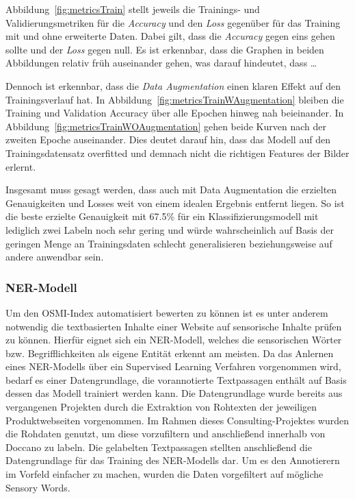 Abbildung~\ref{fig:metricsTrain} stellt jeweils die Trainings- und Validierungsmetriken für die \textit{Accuracy} und den \textit{Loss} gegenüber für das Training mit und ohne erweiterte Daten.
Dabei gilt, dass die \textit{Accuracy} gegen eins gehen sollte und der \textit{Loss} gegen null.
Es ist erkennbar, dass die Graphen in beiden Abbildungen relativ früh auseinander gehen, was darauf hindeutet, dass \ldots

Dennoch ist erkennbar, dass die \textit{Data Augmentation} einen klaren Effekt auf den Trainingsverlauf hat. In Abbildung~\ref{fig:metricsTrainWAugmentation} bleiben die Training und Validation Accuracy über alle Epochen hinweg nah beieinander.
In Abbildung~\ref{fig:metricsTrainWOAugmentation} gehen beide Kurven nach der zweiten Epoche auseinander. Dies deutet darauf hin, dass das Modell auf den Trainingsdatensatz overfitted und demnach nicht die richtigen Features der Bilder erlernt.

Insgesamt muss gesagt werden, dass auch mit Data Augmentation die erzielten Genauigkeiten und Losses weit von einem idealen Ergebnis entfernt liegen.
So ist die beste erzielte Genauigkeit mit 67.5\% für ein Klassifizierungsmodell mit lediglich zwei Labeln noch sehr gering und würde wahrscheinlich auf Basis der geringen Menge an Trainingsdaten schlecht generalisieren beziehungsweise auf andere anwendbar sein.

\subsubsection{NER-Modell}
Um den \ac{OSMI}-Index automatisiert bewerten zu können ist es unter anderem notwendig die textbasierten Inhalte einer
Website auf sensorische Inhalte prüfen zu können.
Hierfür eignet sich ein \ac{NER}-Modell, welches die sensorischen Wörter bzw. Begrifflichkeiten als eigene Entität erkennt
am meisten.
Da das Anlernen eines NER-Modells über ein Supervised Learning Verfahren vorgenommen wird, bedarf es einer Datengrundlage,
die vorannotierte Textpassagen enthält auf Basis dessen das Modell trainiert werden kann.
Die Datengrundlage wurde bereits aus vergangenen Projekten durch die Extraktion von Rohtexten der jeweiligen Produktwebseiten
vorgenommen.
Im Rahmen dieses Consulting-Projektes wurden die Rohdaten genutzt, um diese vorzufiltern und anschließend innerhalb von
Doccano zu labeln.
Die gelabelten Textpassagen stellten anschließend die Datengrundlage für das Training des \ac{NER}-Modells dar.
Um es den Annotierern im Vorfeld einfacher zu machen, wurden die Daten vorgefiltert auf mögliche Sensory Words.


